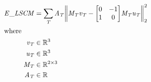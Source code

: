 \documentclass[12pt]{article}
\let\originalleft\left
\let\originalright\right
\renewcommand{\left}{\mathopen{}\mathclose\bgroup\originalleft}
\renewcommand{\right}{\aftergroup\egroup\originalright}
\begin{document}
\begin{center}
\resizebox{\textwidth}{!} 
{
\begin{minipage}[c]{\textwidth}
\begin{align*}
\mathit{E\_LSCM} & = \sum_\mathit{T} \mathit{A}_{ \mathit{T} }\left\|\mathit{M}_{ \mathit{T} }\mathit{v}_{ \mathit{T} } - \begin{bmatrix}
0 & -1\\
1 & 0\\
\end{bmatrix}\mathit{M}_{ \mathit{T} }\mathit{u}_{ \mathit{T} }\right\|_2^{2} \\
\intertext{where} 
\mathit{v}_{\mathit{T}} & \in \mathbb{R}^{ 3} \\
\mathit{u}_{\mathit{T}} & \in \mathbb{R}^{ 3} \\
\mathit{M}_{\mathit{T}} & \in \mathbb{R}^{ 2 \times 3 } \\
\mathit{A}_{\mathit{T}} & \in \mathbb{R} \\
\\
\end{align*}
\end{minipage}
}
\end{center}
\end{document}
